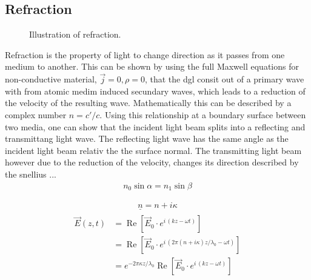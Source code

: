\subsection{Refraction}
% 
\begin{figure}[!t]
\centering
\def\tikzwidth{\textwidth}
\label{fig:optic_refraction}
\caption{Illustration of refraction.}
\end{figure}
% 
Refraction is the property of light to change direction as it passes from one medium to another. This can be shown by using the full Maxwell equations  for non-conductive material, \ie{} $\vec{j} = 0, \rho = 0$, that the dgl consit out of a primary wave with from atomic medim induced secundary waves, which leads to a reduction of the velocity of the resulting wave. Mathematically this can be described by a complex number $n = c' / c$.
Using this relationship at a boundary surface between two media, one can show that the incident light beam splits into a reflecting and transmittang light wave. The reflecting light wave has the same angle as the incident light beam relativ the the surface normal. The transmitting light beam however due to the reduction of the velocity, changes its direction described by the snellius ...
\begin{align}
    n_0 \sin \alpha = n_1 \sin \beta
\end{align}

% 
\begin{align}
\underline{n} = n + i\kappa
\end{align}
% 
\begin{align}
\begin{split}
\vec{E}(z, t) &= \operatorname{Re}\! \left[\vec{E}_0 \cdot e^{i\, (kz - \omega t)}\right] \\
&= \operatorname{Re}\! \left[\vec{E}_0 \cdot e^{i\, (2\pi(n + i\kappa)z/\lambda_0 - \omega t)}\right] \\
&= e^{-2\pi \kappa z/\lambda_0} \operatorname{Re}\! \left[\vec{E}_0 \cdot e^{i\, (kz - \omega t)}\right]
\end{split}
\end{align}
% 
% 
% 
